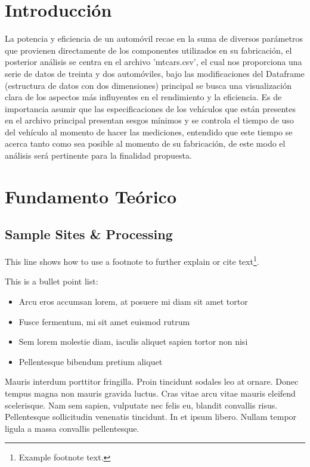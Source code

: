 \documentclass[
    a4paper, %
    10pt, %
    unnumbered sections, %
    two side, %
]{LTJournalArticle}
\begin{document}
\section{Introducción}

La potencia y eficiencia de un automóvil recae en la suma de diversos parámetros que provienen directamente de los componentes utilizados en su fabricación, el posterior análisis se centra en el archivo 'mtcars.csv', el cual nos proporciona una serie de datos de treinta y dos automóviles, bajo las modificaciones del Dataframe (estructura de datos con dos dimensiones) principal se busca una visualización clara de los aspectos más influyentes en el rendimiento y la eficiencia. Es de importancia asumir que las especificaciones de los vehículos que están presentes en el archivo principal presentan sesgos mínimos y se controla el tiempo de uso del vehículo al momento de hacer las mediciones, entendido que este tiempo se acerca tanto como sea posible al momento de su fabricación, de este modo el análisis será pertinente para la finalidad propuesta.

\section{Fundamento Teórico}

\subsection{Sample Sites \& Processing}

This line shows how to use a footnote to further explain or cite text\footnote{Example footnote text.}.

This is a bullet point list:

\begin{itemize}
    \item Arcu eros accumsan lorem, at posuere mi diam sit amet tortor
    \item Fusce fermentum, mi sit amet euismod rutrum
    \item Sem lorem molestie diam, iaculis aliquet sapien tortor non nisi
    \item Pellentesque bibendum pretium aliquet
\end{itemize}

Mauris interdum porttitor fringilla. Proin tincidunt sodales leo at ornare. Donec tempus magna non mauris gravida luctus. Cras vitae arcu vitae mauris eleifend scelerisque. Nam sem sapien, vulputate nec felis eu, blandit convallis risus. Pellentesque sollicitudin venenatis tincidunt. In et ipsum libero. Nullam tempor ligula a massa convallis pellentesque.
\end{document}
